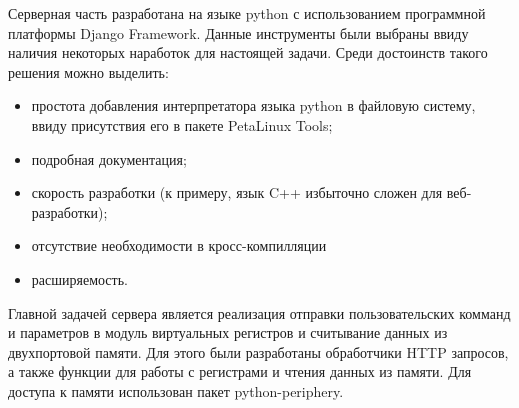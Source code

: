 Серверная часть разработана на языке python с использованием программной платформы Django Framework. Данные инструменты были выбраны ввиду наличия некоторых наработок для настоящей задачи. Среди достоинств такого решения можно выделить:\par
\begin{itemize}
    \item простота добавления интерпретатора языка python в файловую систему, ввиду присутствия его в пакете PetaLinux Tools;
    \item подробная документация;
    \item скорость разработки (к примеру, язык C++ избыточно сложен для веб-разработки);
    \item отсутствие необходимости в кросс-компилляции
    \item расширяемость.
\end{itemize}\par
Главной задачей сервера является реализация отправки пользовательских комманд и параметров в модуль виртуальных регистров и считывание данных из двухпортовой памяти. Для этого были разработаны обработчики HTTP запросов, а также функции для работы с регистрами и чтения данных из памяти. Для доступа к памяти использован пакет python-periphery.\par
